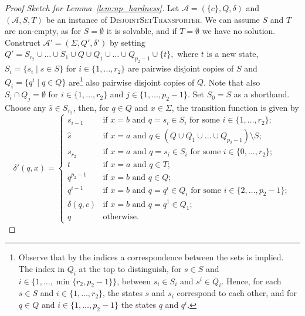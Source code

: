 \begin{proof}[Proof Sketch for Lemma~\ref{lem:np_hardness}]
Let $\mathcal A = (\{c\}, Q, \delta)$ and $(\mathcal A, S, T)$
be an instance of \textsc{DisjointSetTransporter}.
We can assume $S$ and $T$ are non-empty, as for $S = \emptyset$
it is solvable, and if $T = \emptyset$ we have no solution.
Construct $\mathcal A' = (\Sigma, Q', \delta')$
by setting
$
 Q' = S_{r_2} \cup \ldots \cup S_{1} \cup Q \cup Q_1 \cup \ldots \cup Q_{p_2-1} \cup \{ t \},
$
where $t$ is a new state, $S_i = \{ s_i \mid s \in S \}$ for $i \in \{1,\ldots, r_2 \}$
are pairwise disjoint copies of $S$
and $Q_i = \{ q^i \mid q \in Q \}$ are\footnote{Observe
that by the indices a correspondence between the sets
is implied. The index
in $Q_i$ at the top to distinguish, for $s \in S$ and $i \in \{1,\ldots,\min\{r_2, p_2-1\}\}$, between
 $s_i \in S_i$ and $s^i \in Q_i$. Hence, for each $s \in S$ and $i \in \{1,\ldots, r_2\}$,
 the states $s$ and $s_i$ correspond to each other, and for $q \in Q$
 and $i \in \{1,\ldots, p_2-1\}$ the states $q$ and $q^i$.} 
 also pairwise disjoint 
copies of $Q$. Note that also $S_i \cap Q_j = \emptyset$
for $i \in \{1,\ldots, r_2 \}$ and $j \in \{1,\ldots, p_2-1\}$.
Set $S_0 = S$ %
as a shorthand.
Choose any $\hat s \in S_{r_2}$, then, for $q \in Q$ and $x \in \Sigma$, the transition function is given by
\[
 \delta'(q, x) = \left\{
 \begin{array}{ll}
  s_{i-1} & \mbox{if } x = b \mbox{ and } q = s_i \in S_i \mbox{ for some } i \in \{1,\ldots, r_2\}; \\ 
  \hat s & \mbox{if } x = a \mbox{ and } q \in (Q \cup Q_1 \cup \ldots \cup Q_{p_2-1}) \setminus S; \\
  s_{r_2} & \mbox{if } x= a \mbox{ and } q = s_i \in S_i \mbox{ for some } i \in \{0,\ldots,r_2\}; \\
  t       & \mbox{if } x = a \mbox{ and } q \in T; \\
  q^{p_2-1} & \mbox{if } x = b \mbox{ and } q \in Q; \\
  q^{i-1} & \mbox{if } x = b \mbox{ and } q = q^i \in Q_i \mbox{ for some } i \in \{2,\ldots,p_2-1\}; \\
  \delta(q, c) & \mbox{if } x = b \mbox{ and } q = q^1 \in Q_1; \\
  q       & \mbox{otherwise}.
 \end{array}
 \right.
\]




\end{proof}
